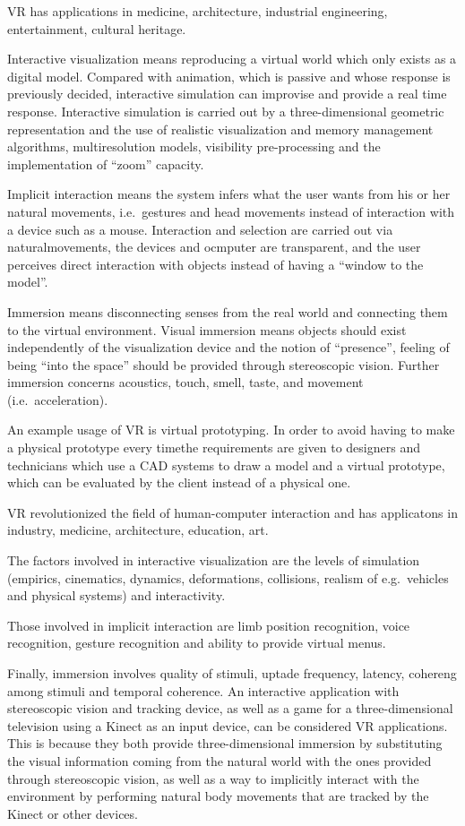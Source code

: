 \documentclass[a4paper]{article}
\begin{document}
VR has applications in medicine, architecture, industrial engineering,
entertainment, cultural heritage.

Interactive visualization means reproducing a virtual world which only
exists as a digital model. Compared with animation, which is passive and
whose response is previously decided, interactive simulation can
improvise and provide a real time response. Interactive simulation is
carried out by a three-dimensional geometric representation and the use
of realistic visualization and memory management algorithms,
multiresolution models, visibility pre-processing and the implementation
of ``zoom'' capacity.

Implicit interaction means the system infers what the user wants from
his or her natural movements, i.e.~gestures and head movements instead
of interaction with a device such as a mouse. Interaction and selection
are carried out via naturalmovements, the devices and ocmputer are
transparent, and the user perceives direct interaction with objects
instead of having a ``window to the model''.

Immersion means disconnecting senses from the real world and connecting
them to the virtual environment. Visual immersion means objects should
exist independently of the visualization device and the notion of
``presence'', feeling of being ``into the space'' should be provided
through stereoscopic vision. Further immersion concerns acoustics,
touch, smell, taste, and movement (i.e.~acceleration).

An example usage of VR is virtual prototyping. In order to avoid having
to make a physical prototype every timethe requirements are given to
designers and technicians which use a CAD systems to draw a model and a
virtual prototype, which can be evaluated by the client instead of a
physical one.

VR revolutionized the field of human-computer interaction and has
applicatons in industry, medicine, architecture, education, art.

The factors involved in interactive visualization are the levels of
simulation (empirics, cinematics, dynamics, deformations, collisions,
realism of e.g.~vehicles and physical systems) and interactivity.

Those involved in implicit interaction are limb position recognition,
voice recognition, gesture recognition and ability to provide virtual
menus.

Finally, immersion involves quality of stimuli, uptade frequency,
latency, cohereng among stimuli and temporal coherence. An interactive
application with stereoscopic vision and tracking device, as well as a
game for a three-dimensional television using a Kinect as an input
device, can be considered VR applications. This is because they both
provide three-dimensional immersion by substituting the visual
information coming from the natural world with the ones provided through
stereoscopic vision, as well as a way to implicitly interact with the
environment by performing natural body movements that are tracked by the
Kinect or other devices.
\end{document}
